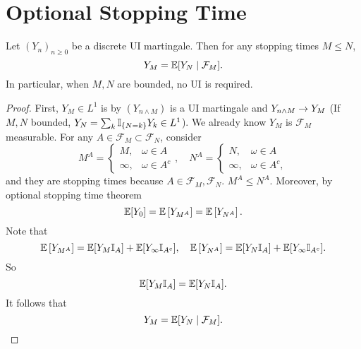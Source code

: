 \section{Optional Stopping Time}

\begin{thm}
    Let $(Y_n)_{n \geq 0}$ be a discrete UI martingale. Then for any stopping times $M \leq N$,
    \begin{equation*}
        Y_M = \mathbb{E}[Y_N \mid \mathcal{F}_M].
    \end{equation*}
    In particular, when $M,N$ are bounded, no UI is required.
\end{thm}
\begin{proof}
    First, $Y_M \in L^1$ is by $(Y_{n \wedge M})$ is a UI martingale and $Y_{n \wedge M} \rightarrow Y_M$ (If $M,N$ bounded, $Y_N = \sum_k\mathbb{I}_{\left\{N=k\right\}} Y_k \in L^1$). We already know $Y_M$ is $\mathcal{F}_M$ measurable. For any $A \in \mathcal{F}_M \subset \mathcal{F}_N$, consider
    \begin{equation*}
        M^A = \begin{cases}
            M,&\omega \in A \\
            \infty,& \omega \in A^c
        \end{cases},\quad N^A = \begin{cases}
            N,&\omega \in A \\
            \infty,& \omega \in A^c,
        \end{cases}
    \end{equation*}
    and they are stopping times because $A \in \mathcal{F}_M,\mathcal{F}_N$. $M^A \leq N^A$. Moreover, by optional stopping time theorem
    \begin{equation*}
        \mathbb{E}[Y_0] = \mathbb{E}\left[Y_{M^A}\right] = \mathbb{E}\left[Y_{N^A}\right].
    \end{equation*}
    Note that
    \begin{equation*}
        \mathbb{E}\left[Y_{M^A}\right] = \mathbb{E}[Y_M\mathbb{I}_A] + \mathbb{E}[Y_\infty \mathbb{I}_{A^c}],\quad\mathbb{E}\left[Y_{N^A}\right] = \mathbb{E}[Y_N\mathbb{I}_A] + \mathbb{E}[Y_\infty \mathbb{I}_{A^c}]. 
    \end{equation*}
    So
    \begin{equation*}
        \mathbb{E}[Y_M\mathbb{I}_A] = \mathbb{E}[Y_N\mathbb{I}_A].
    \end{equation*}
    It follows that
    \begin{equation*}
        Y_M = \mathbb{E}[Y_N \mid \mathcal{F}_M]. \qedhere
    \end{equation*}
\end{proof}
